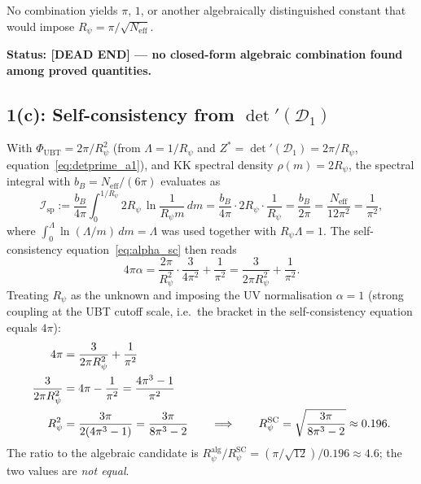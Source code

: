\documentclass[11pt,a4paper]{article}
\theoremstyle{definition}
\theoremstyle{remark}
\begin{document}
\noindent
No combination yields $\pi$, $1$, or another algebraically distinguished
constant that would impose $R_\psi = \pi/\sqrt{N_{\mathrm{eff}}}$.

\medskip
\textbf{Status: \textbf{[DEAD END]} --- no closed-form algebraic combination
found among proved quantities.}

\subsection{1(c): Self-consistency from $\det'(\mathcal{D}_1)$}
\label{subsec:Rpsi_selfconsistency}

With $\Phi_{\mathrm{UBT}} = 2\pi/R_\psi^2$
(from $\Lambda = 1/R_\psi$ and $Z^* = \det'(\mathcal{D}_1) = 2\pi/R_\psi$,
equation~\eqref{eq:detprime_a1}), and KK spectral density $\rho(m) = 2R_\psi$,
the spectral integral with $b_B = N_{\mathrm{eff}}/(6\pi)$ evaluates as
\begin{equation}
  \mathcal{I}_{\mathrm{sp}}
  := \frac{b_B}{4\pi}
     \int_0^{1/R_\psi} 2R_\psi\,\ln\!\frac{1}{R_\psi m}\,dm
  = \frac{b_B}{4\pi}\cdot 2R_\psi\cdot\frac{1}{R_\psi}
  = \frac{b_B}{2\pi}
  = \frac{N_{\mathrm{eff}}}{12\pi^2}
  = \frac{1}{\pi^2},
  \label{eq:spectral_exact}
\end{equation}
where $\int_0^\Lambda \ln(\Lambda/m)\,dm = \Lambda$ was used
together with $R_\psi \Lambda = 1$.
The self-consistency equation~\eqref{eq:alpha_sc} then reads
\begin{equation}
  4\pi\alpha
  = \frac{2\pi}{R_\psi^2}\cdot\frac{3}{4\pi^2}
    + \frac{1}{\pi^2}
  = \frac{3}{2\pi R_\psi^2} + \frac{1}{\pi^2}.
  \label{eq:alpha_Rpsi}
\end{equation}
Treating $R_\psi$ as the unknown and imposing the UV normalisation
$\alpha = 1$ (strong coupling at the UBT cutoff scale, i.e.\ the
bracket in the self-consistency equation equals $4\pi$):
\begin{align}
  4\pi &= \frac{3}{2\pi R_\psi^2} + \frac{1}{\pi^2}
  \notag\\
  \frac{3}{2\pi R_\psi^2} &= 4\pi - \frac{1}{\pi^2} = \frac{4\pi^3-1}{\pi^2}
  \notag\\
  R_\psi^2 &= \frac{3\pi}{2(4\pi^3-1)} = \frac{3\pi}{8\pi^3-2}
  \qquad\Longrightarrow\qquad
  R_\psi^{\mathrm{SC}}
  = \sqrt{\frac{3\pi}{8\pi^3-2}}
  \approx 0.196.
  \label{eq:Rpsi_selfcons}
\end{align}
The ratio to the algebraic candidate is
$R_\psi^{\mathrm{alg}}/R_\psi^{\mathrm{SC}}
= (\pi/\sqrt{12})/0.196 \approx 4.6$;
the two values are \emph{not equal}.
\end{document}
